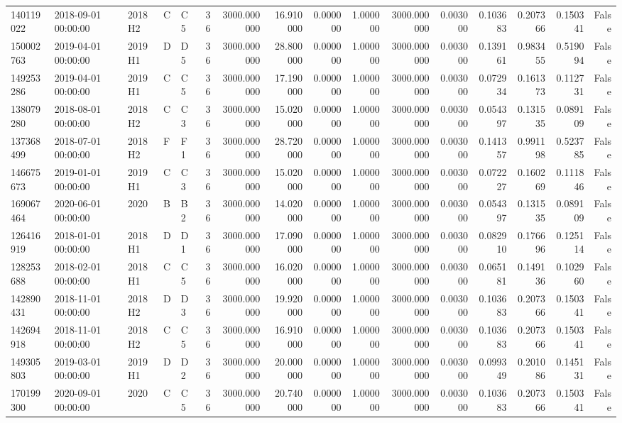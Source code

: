 \begin{tabular}{lllllrrrrrrrrrrr}
140119022 & 2018-09-01 00:00:00 & 2018H2 & C & C5 & 36 & 3000.000000 & 16.910000 & 0.000000 & 1.000000 & 3000.000000 & 0.003000 & 0.103683 & 0.207366 & 0.150341 & False \\
150002763 & 2019-04-01 00:00:00 & 2019H1 & D & D5 & 36 & 3000.000000 & 28.800000 & 0.000000 & 1.000000 & 3000.000000 & 0.003000 & 0.139161 & 0.983455 & 0.519094 & False \\
149253286 & 2019-04-01 00:00:00 & 2019H1 & C & C5 & 36 & 3000.000000 & 17.190000 & 0.000000 & 1.000000 & 3000.000000 & 0.003000 & 0.072934 & 0.161373 & 0.112731 & False \\
138079280 & 2018-08-01 00:00:00 & 2018H2 & C & C3 & 36 & 3000.000000 & 15.020000 & 0.000000 & 1.000000 & 3000.000000 & 0.003000 & 0.054397 & 0.131535 & 0.089109 & False \\
137368499 & 2018-07-01 00:00:00 & 2018H2 & F & F1 & 36 & 3000.000000 & 28.720000 & 0.000000 & 1.000000 & 3000.000000 & 0.003000 & 0.141357 & 0.991198 & 0.523785 & False \\
146675673 & 2019-01-01 00:00:00 & 2019H1 & C & C3 & 36 & 3000.000000 & 15.020000 & 0.000000 & 1.000000 & 3000.000000 & 0.003000 & 0.072227 & 0.160269 & 0.111846 & False \\
169067464 & 2020-06-01 00:00:00 & 2020 & B & B2 & 36 & 3000.000000 & 14.020000 & 0.000000 & 1.000000 & 3000.000000 & 0.003000 & 0.054397 & 0.131535 & 0.089109 & False \\
126416919 & 2018-01-01 00:00:00 & 2018H1 & D & D1 & 36 & 3000.000000 & 17.090000 & 0.000000 & 1.000000 & 3000.000000 & 0.003000 & 0.082910 & 0.176696 & 0.125114 & False \\
128253688 & 2018-02-01 00:00:00 & 2018H1 & C & C5 & 36 & 3000.000000 & 16.020000 & 0.000000 & 1.000000 & 3000.000000 & 0.003000 & 0.065181 & 0.149136 & 0.102960 & False \\
142890431 & 2018-11-01 00:00:00 & 2018H2 & D & D3 & 36 & 3000.000000 & 19.920000 & 0.000000 & 1.000000 & 3000.000000 & 0.003000 & 0.103683 & 0.207366 & 0.150341 & False \\
142694918 & 2018-11-01 00:00:00 & 2018H2 & C & C5 & 36 & 3000.000000 & 16.910000 & 0.000000 & 1.000000 & 3000.000000 & 0.003000 & 0.103683 & 0.207366 & 0.150341 & False \\
149305803 & 2019-03-01 00:00:00 & 2019H1 & D & D2 & 36 & 3000.000000 & 20.000000 & 0.000000 & 1.000000 & 3000.000000 & 0.003000 & 0.099349 & 0.201086 & 0.145131 & False \\
170199300 & 2020-09-01 00:00:00 & 2020 & C & C5 & 36 & 3000.000000 & 20.740000 & 0.000000 & 1.000000 & 3000.000000 & 0.003000 & 0.103683 & 0.207366 & 0.150341 & False \\

\end{tabular}
